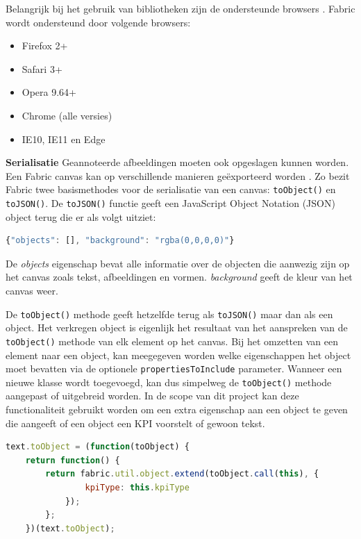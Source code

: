 Belangrijk bij het gebruik van bibliotheken zijn de ondersteunde browsers \cite{Fabricsupportedbrowsers}. Fabric wordt ondersteund door volgende browsers: 
\begin{itemize}
	\item Firefox 2+
	\item Safari 3+ 
	\item Opera 9.64+
	\item Chrome (alle versies)
	\item IE10, IE11 en Edge
\end{itemize}

\textbf{Serialisatie}
Geannoteerde afbeeldingen moeten ook opgeslagen kunnen worden. Een Fabric canvas kan op verschillende manieren ge\"{e}xporteerd worden \cite{FabricJSIntro3Serialization}. Zo bezit Fabric twee basismethodes voor de serialisatie van een canvas: \texttt{toObject()} en \texttt{toJSON()}. De \texttt{toJSON()} functie geeft een JavaScript Object Notation (JSON) object terug die er als volgt uitziet:

\begin{lstlisting}[language=javascript]
 {"objects": [], "background": "rgba(0,0,0,0)"}
\end{lstlisting} 

De \textit{objects} eigenschap bevat alle informatie over de objecten die aanwezig zijn op het canvas zoals tekst, afbeeldingen en vormen. \textit{background} geeft de kleur van het canvas weer. 


De \texttt{toObject()} methode geeft hetzelfde terug als \texttt{toJSON()} maar dan als een object. Het verkregen object is eigenlijk het resultaat van het aanspreken van de \texttt{toObject()} methode van elk element op het canvas. Bij het omzetten van een element naar een object, kan meegegeven worden welke eigenschappen het object moet bevatten via de optionele \texttt{propertiesToInclude} parameter. Wanneer een nieuwe klasse wordt toegevoegd, kan dus simpelweg de \texttt{toObject()} methode aangepast of uitgebreid worden. In de scope van dit project kan deze functionaliteit gebruikt worden om een extra eigenschap aan een object te geven die aangeeft of een object een KPI voorstelt of gewoon tekst.  

\begin{lstlisting}[language=javascript]
	text.toObject = (function(toObject) {   
	return function() {     
		return fabric.util.object.extend(toObject.call(this), {       
				kpiType: this.kpiType     
			});   
		}; 
	})(text.toObject);
\end{lstlisting}

